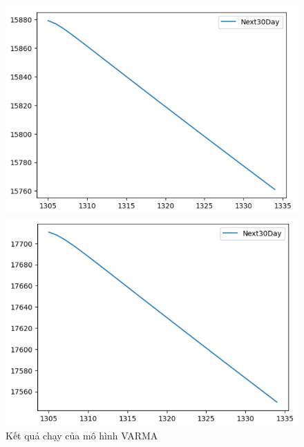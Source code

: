 \begin{figure}[H]
\begin{minipage}{0.15\textwidth}
    \end{minipage}
    \hfill
    \begin{minipage}{0.15\textwidth}
    \centering
    \includegraphics[width=1\textwidth]{resources/chapter-5/newdata/predicted/EIB_VARMA_8-2_30days.png}
    \end{minipage}
    \hfill
        \begin{minipage}{0.15\textwidth}
    \centering
    \includegraphics[width=1\textwidth]{resources/chapter-5/newdata/predicted/EIB_VARMA_9-1_30days.png}
    \end{minipage}
    \hfill
    
    \caption{Kết quả chạy của mô hình VARMA}
    \label{fig:varma_predicted}
\end{figure}




